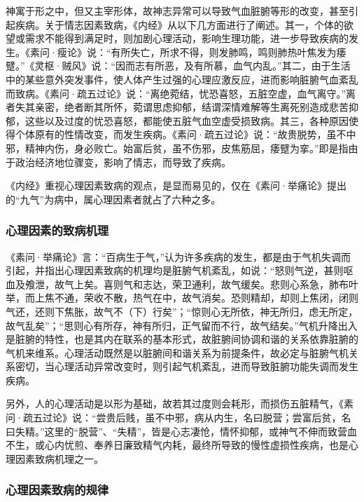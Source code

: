 \documentclass[12pt]{ctexbook}
\begin{document}
神寓于形之中，但又主宰形体，故神志异常可以导致气血脏腑等形的改变，甚至引起疾病。关于情志因素致病，《内经》从以下几方面进行了阐述。其一，个体的欲望或需求不能得到满足时，则加剧心理活动，影响生理功能，进一步导致疾病的发生。《素问·瘦论》说：“有所失亡，所求不得，则发肺鸣，鸣则肺热叶焦发为痿躄。”《灵枢·贼风》说：“因而志有所恶，及有所慕，血气内乱。”其二，由于生活中的某些意外突发事件，使人体产生过强的心理应激反应，进而影响脏腑气血紊乱而致病。《素问·疏五过论》说：“离绝菀结，忧恐喜怒，五脏空虚，血气离守。”离者失其亲密，绝者断其所怀，菀谓思虑抑郁，结谓深情难解等生离死别造成悲苦抑郁，这些以及过度的忧恐喜怒，都能使五脏气血空虚受损致病。其三，各种原因使得个体原有的性情改变，而发生疾病。《素问·疏五过论》说：“故贵脱势，虽不中邪，精神内伤，身必败亡。始富后贫，虽不伤邪，皮焦筋屈，痿躄为挛。”即是指由于政治经济地位骤变，影响了情志，而导致了疾病。

《内经》重视心理因素致病的观点，是显而易见的，仅在《素问·举痛论》提出的“九气”为病中，属心理因素者就占了六种之多。

\subsubsection{心理因素的致病机理}%

《素问·举痛论》言：“百病生于气，”认为许多疾病的发生，都是由于气机失调而引起，并指出心理因素致病的机理均是脏腑气机紊乱，如说：“怒则气逆，甚则呕血及飧泄，故气上矣。喜则气和志达，荣卫通利，故气缓矣。悲则心系急，肺布叶举，而上焦不通，荣收不散，热气在中，故气消矣。恐则精却，却则上焦闭，闭则气还，还则下焦胀，故气不（下）行矣”；“惊则心无所依，神无所归，虑无所定，故气乱矣”；“思则心有所存，神有所归，正气留而不行，故气结矣。”气机升降出入是脏腑的特性，也是其内在联系的基本形式，故脏腑间协调和谐的关系依靠脏腑的气机来维系。心理活动既然是以脏腑间和谐关系为前提条件，故必定与脏腑气机关系密切，当心理活动异常改变时，则引起气机紊乱，进而导致脏腑功能失调而发生疾病。

另外，人的心理活动是以形为基础，故若其过度则会耗形，而损伤五脏精气，《素问·疏五过论》说：“尝贵后贱，虽不中邪，病从内生，名曰脱营；尝富后贫，名曰失精。”这里的“脱营”、“失精”，皆是心志凄怆，情怀抑郁，或神气不伸而致营血不生，或心内忧煎、奉养日廉致精气内耗，最终所导致的慢性虚损性疾病，也是心理因素致病机理之一。

\subsubsection{心理因素致病的规律}%
\end{document}
